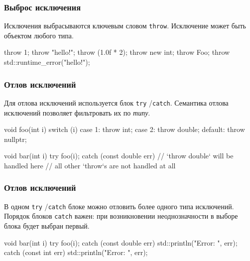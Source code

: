 \documentclass[compress, 8pt, aspectratio=169]{beamer}
\begin{document}
  \begin{frame}[fragile]

    \frametitle{Выброс исключения}

    Исключения выбрасываются ключевым словом \texttt{throw}.
    Исключение может быть объектом любого типа.

    \begin{myinplacelisting}[minted language=cpp]
throw 1;
throw "hello!";
throw (1.0f * 2);
throw new int;
throw Foo{};
throw std::runtime_error("hello!");
    \end{myinplacelisting}

  \end{frame}

  \begin{frame}[fragile]

    \frametitle{Отлов исключений}

    Для отлова исключений используется блок \texttt{try} \slash \texttt{catch}.
    Семантика отлова исключений позволяет фильтровать их по \textit{типу}.

    \begin{myinplacelisting}[minted language=cpp]
void foo(int i) {
    switch (i) {
        case 1:  throw int{};
        case 2:  throw double{};
        default: throw nullptr;
    }
}

void bar(int i) {
    try {
        foo(i);
    }
    catch (const double err) {
        // `throw double` will be handled here
    }
    // all other `throw`s are not handled at all
}
    \end{myinplacelisting}

  \end{frame}

  \begin{frame}[fragile]

    \frametitle{Отлов исключений}

    В одном \texttt{try} \slash \texttt{catch} блоке можно отловить более
    одного типа исключений.
    Порядок блоков \texttt{catch} важен:
    при возникновении неоднозначности в выборе блока будет выбран первый.

    \begin{myinplacelisting}[minted language=cpp]
void bar(int i) {
    try {
        foo(i);
    }
    catch (const double err) {
        std::println("Error: {}", err);
    }
    catch (const int err) {
        std::println("Error: {}", err);
    }
}
    \end{myinplacelisting}

  \end{frame}
\end{document}
